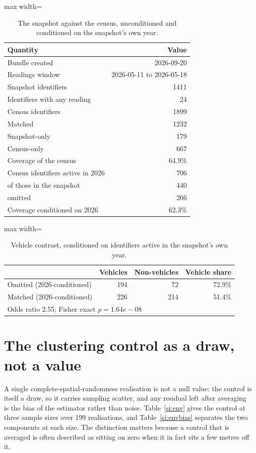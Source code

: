 \documentclass[fleqn,10pt]{wlpeerj}
\begin{document}
\begin{table}[H]
\centering
\caption{The snapshot against the census, unconditioned and conditioned on the snapshot's own
year.}
\label{si:snap}
\small
\begin{adjustbox}{max width=\linewidth}
\begin{tabular}{lr}
\toprule
Quantity & Value \\
\midrule
Bundle created & 2026-09-20 \\
Readings window & 2026-05-11 to 2026-05-18 \\
Snapshot identifiers & 1411 \\
Identifiers with any reading & 24 \\
Census identifiers & 1899 \\
Matched & 1232 \\
Snapshot-only & 179 \\
Census-only & 667 \\
Coverage of the census & 64.9\% \\
Census identifiers active in 2026 & 706 \\
\quad of those in the snapshot & 440 \\
\quad omitted & 266 \\
Coverage conditioned on 2026 & 62.3\% \\
\bottomrule
\end{tabular}
\end{adjustbox}
\end{table}

\begin{table}[H]
\centering
\caption{Vehicle contrast, conditioned on identifiers active in the snapshot's own year.}
\label{si:veh}
\small
\begin{adjustbox}{max width=\linewidth}
\begin{tabular}{lrrr}
\toprule
 & Vehicles & Non-vehicles & Vehicle share \\
\midrule
Omitted (2026-conditioned) & 194 & 72 & 72.9\% \\
Matched (2026-conditioned) & 226 & 214 & 51.4\% \\
\midrule
\multicolumn{4}{l}{Odds ratio 2.55; Fisher exact $p = 1.64e-08$} \\
\bottomrule
\end{tabular}
\end{adjustbox}
\end{table}

\section{The clustering control as a draw, not a value}
\label{si:envelope}
A single complete-spatial-randomness realisation is not a null value: the control is itself a
draw, so it carries sampling scatter, and any residual left after averaging is the bias of the
estimator rather than noise. Table~\ref{si:env} gives the control at three sample sizes over
199 realisations, and Table~\ref{si:envbias} separates the two components at each size.
The distinction matters because a control that is averaged is often described as sitting on
zero when it in fact sits a few metres off it.
\end{document}
